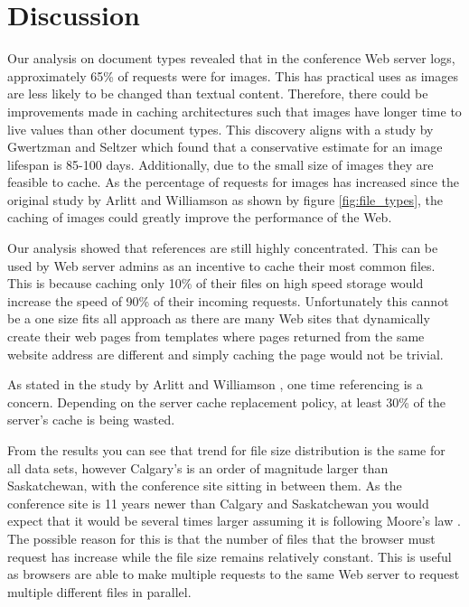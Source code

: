 \documentclass[10pt,conference]{IEEEtran}
\begin{document}
\section{Discussion}\label{discussion}
Our analysis on document types revealed that in the conference Web server logs, approximately 65\% of requests were for images. This has practical uses as images are less likely to be changed than textual content. Therefore, there could be improvements made in caching architectures such that images have longer time to live values than other document types. This discovery aligns with a study by Gwertzman and Seltzer \cite{Gwertzman} which found that a conservative estimate for an image lifespan is 85-100 days. Additionally, due to the small size of images they are feasible to cache. As the percentage of requests for images has increased since the original study by Arlitt and Williamson \cite{invariants} as shown by figure \ref{fig:file_types}, the caching of images could greatly improve the performance of the Web.

Our analysis showed that references are still highly concentrated. This can be used by Web server admins as an incentive to cache their most common files. This is because caching only 10\% of their files on high speed storage would increase the speed of 90\% of their incoming requests. Unfortunately this cannot be a one size fits all approach as there are many Web sites that dynamically create their web pages from templates where pages returned from the same website address are different and simply caching the page would not be trivial.

As stated in the study by Arlitt and Williamson \cite{invariants}, one time referencing is a concern. Depending on the server cache replacement policy, at least 30\% of the server's cache is being wasted. 

From the results you can see that trend for file size distribution is the same for all data sets, however Calgary's is an order of magnitude larger than Saskatchewan, with the conference site sitting in between them. As the conference site is 11 years newer than Calgary and Saskatchewan you would expect that it would be several times larger assuming it is following Moore's law \cite{williams05}. The possible reason for this is that the number of files that the browser must request has increase while the file size remains relatively constant. This is useful as browsers are able to make multiple requests to the same Web server to request multiple different files in parallel.
\end{document}
